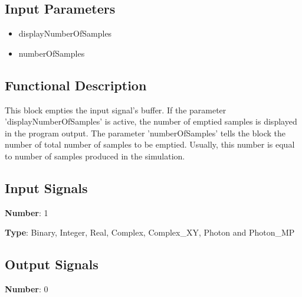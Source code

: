 \documentclass[../../sdf/tex/BPSK_system.tex]{subfiles}
\date{}
\begin{document}
\onlyinsubfile{\maketitle}

\subsection*{Input Parameters}

\begin{multicols}{2}
	\begin{itemize}
		\item displayNumberOfSamples
		\item numberOfSamples
	\end{itemize}
\end{multicols}

\subsection*{Functional Description}

This block empties the input signal's buffer. If the parameter 'displayNumberOfSamples' is active, the number of emptied samples is displayed in the program output. The parameter 'numberOfSamples' tells the block the number of total number of samples to be emptied. Usually, this number is equal to number of samples produced in the simulation.\\

\subsection*{Input Signals}

\textbf{Number}: 1

\textbf{Type}:  Binary, Integer, Real, Complex, Complex\_XY, Photon and Photon_MP

\subsection*{Output Signals}

\textbf{Number}: 0
\end{document}
